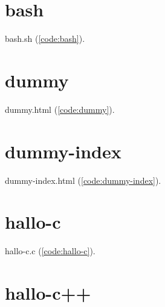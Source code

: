 %

\section{bash}

bash.sh (\autoref{code:bash}).%
%
\lstset{language=Bash}%

\newpage
\section{dummy}

dummy.html (\autoref{code:dummy}).%
%
\lstset{language=HTML}%

\newpage
\section{dummy-index}

dummy-index.html (\autoref{code:dummy-index}).%
%
\lstset{language=HTML}%

\newpage
\section{hallo-c}

hallo-c.c (\autoref{code:hallo-c}).%
%
\lstset{language=C}%

\newpage
\section{hallo-c++}

